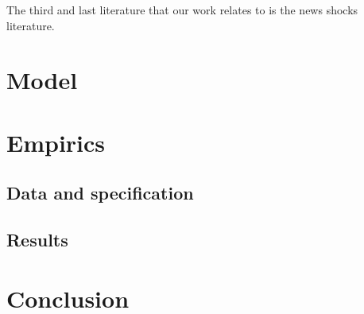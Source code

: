 \documentclass[11pt]{article}
\renewcommand{\[}{\begin{equation}}
\renewcommand{\]}{\end{equation}}
\begin{document}
The third and last literature that our work relates to is the news shocks literature. 

\section{Model}
\label{sec_model}

\section{Empirics}
\label{sec_empirics}
\subsection{Data and specification}
\subsection{Results}

\section{Conclusion}
\label{sec_conclusion}


\newpage
\nocite{*}
 
 
 
\end{document}

